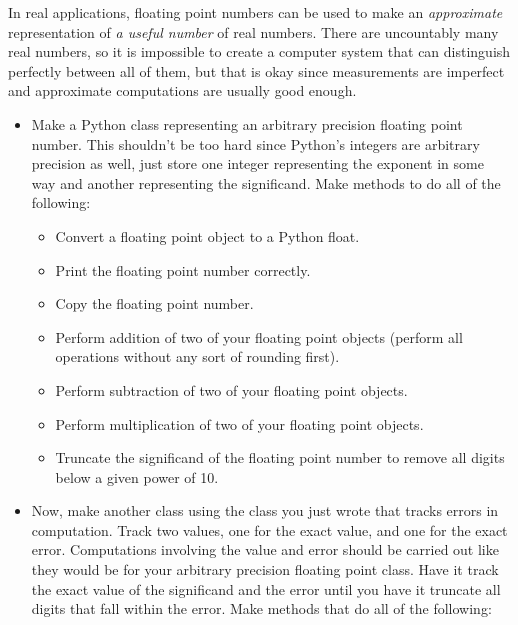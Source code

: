 In real applications, floating point numbers can be used to make an \textit{approximate} representation of \textit{a useful number} of real numbers.
There are uncountably many real numbers, so it is impossible to create a computer system that can distinguish perfectly between all of them, but that is okay since measurements are imperfect and approximate computations are usually good enough.

\begin{problem}
\begin{itemize}

\item Make a Python class representing an arbitrary precision floating point number.
This shouldn't be too hard since Python's integers are arbitrary precision as well, just store one integer representing the exponent in some way and another representing the significand.
Make methods to do all of the following:
	\begin{itemize}

	\item Convert a floating point object to a Python float.

	\item Print the floating point number correctly.

	\item Copy the floating point number.

	\item Perform addition of two of your floating point objects (perform all operations without any sort of rounding first).

	\item Perform subtraction of two of your floating point objects.

	\item Perform multiplication of two of your floating point objects.

	\item Truncate the significand of the floating point number to remove all digits below a given power of 10.

	\end{itemize}

\item Now, make another class using the class you just wrote that tracks errors in computation.
Track two values, one for the exact value, and one for the exact error.
Computations involving the value and error should be carried out like they would be for your arbitrary precision floating point class.
Have it track the exact value of the significand and the error until you have it truncate all digits that fall within the error.
Make methods that do all of the following:
	\begin{itemize}


\end{itemize}
\end{itemize}
\end{problem}
